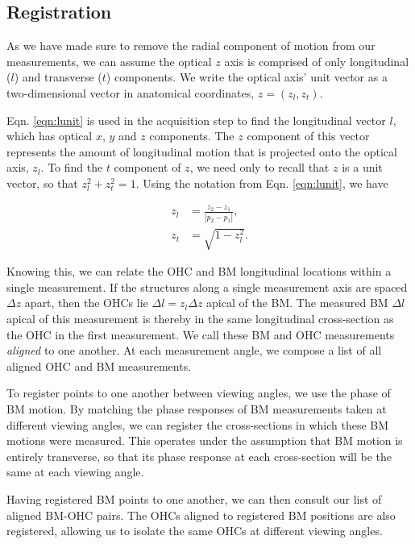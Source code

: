 \documentclass[aip,cp,amsmath,amssymb,reprint]{revtex4-2}
\begin{document}
\subsection{\label{sec:registration}Registration}

\par{As we have made sure to remove the radial component of motion from our measurements, we can assume the optical $z$ axis is comprised of only longitudinal ($l$) and transverse ($t$) components. We write the optical axis’ unit vector as a two-dimensional vector in anatomical
coordinates, $z = (z_l, z_t)$.
}
\par{Eqn. \ref{eqn:lunit} is used in the acquisition step to find the longitudinal vector $l$, which has optical $x$, $y$ and $z$ components. The $z$ component of this vector represents the amount of longitudinal motion that is projected onto the optical axis, $z_l$. To find the $t$ component of $z$, we need only to recall that $z$ is a unit vector, so that $z_l^2 + z_t^2 = 1$. Using the notation from Eqn. \ref{eqn:lunit}, we have

	\begin{align}
		z_l &= \frac{z_2-z_1}{|p_2-p_1|},\\
		z_t &= \sqrt{1-z_l^2}.
	\end{align}
}
\par{Knowing this, we can relate the OHC and BM longitudinal locations within a single measurement. If the structures along a single measurement axis are spaced $\Delta z$ apart, then the OHCs lie $\Delta l = z_l \Delta z$ apical of the BM. The measured BM $\Delta l$ apical of this measurement is thereby in the same longitudinal cross-section as the OHC in the first measurement. We call these BM and OHC measurements \textit{aligned} to one another. At each measurement angle, we compose a list of all aligned OHC and BM measurements.}
\par{To register points to one another between viewing angles, we use the phase of BM motion. By matching the phase responses of BM measurements taken at different viewing angles, we can register the cross-sections in which these BM motions were measured. This operates under the assumption that BM motion is entirely transverse, so that its phase response at each cross-section will be the same at each viewing angle. }
\par{Having registered BM points to one another, we can then consult our list of aligned BM-OHC pairs. The OHCs aligned to registered BM positions are also registered, allowing us to isolate the same OHCs at different viewing angles.}
\end{document}
